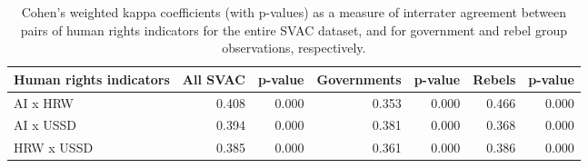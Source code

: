 \begin{table}[h]
\centering
\caption{Cohen's weighted kappa coefficients (with p-values) as a measure of
                      interrater agreement between pairs of human rights indicators for the entire SVAC dataset, and for  
                      government and rebel group observations, respectively.} 
\label{xt-kappa}
\begin{tabular}{lrrrrrr}
  \hline
Human rights indicators & All SVAC & p-value & Governments & p-value & Rebels & p-value \\ 
  \hline
AI x HRW & 0.408 & 0.000 & 0.353 & 0.000 & 0.466 & 0.000 \\ 
  AI x USSD & 0.394 & 0.000 & 0.381 & 0.000 & 0.368 & 0.000 \\ 
  HRW x USSD & 0.385 & 0.000 & 0.361 & 0.000 & 0.386 & 0.000 \\ 
   \hline
\end{tabular}
\end{table}

